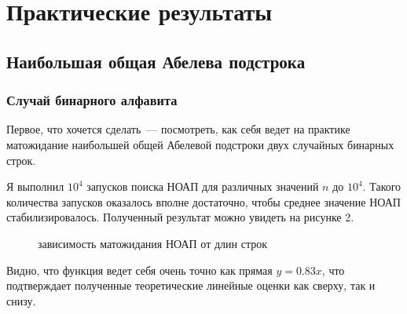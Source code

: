 \chapter{Практические результаты}
\section{Наибольшая общая Абелева подстрока}
\subsection{Случай бинарного алфавита}

Первое, что хочется сделать~--- посмотреть, как себя ведет на практике матожидание наибольшей общей Абелевой подстроки двух случайных бинарных строк. 

Я выполнил $10^4$ запусков поиска НОАП для различных значений $n$ до $10^4$. Такого количества запусков оказалось вполне достаточно, чтобы среднее значение НОАП стабилизировалось. Полученный результат можно увидеть на рисунке 2.

\begin{figure}[h]
\caption{зависимость матожидания НОАП от длин строк}
\end{figure}

Видно, что функция ведет себя очень точно как прямая $y=0.83x$, что подтверждает полученные теоретические линейные оценки как сверху, так и снизу.


